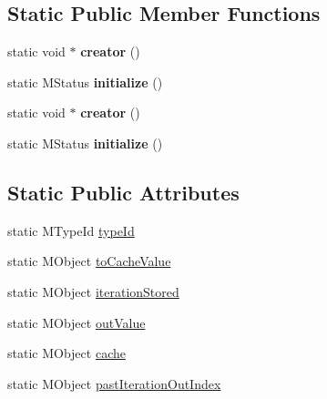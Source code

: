 \subsection*{Static Public Member Functions}
\begin{DoxyCompactItemize}
\item 
\hypertarget{class_m_g__cache_value_af783feaf5d718ffda4fa0008beb18f21}{static void $\ast$ {\bfseries creator} ()}\label{class_m_g__cache_value_af783feaf5d718ffda4fa0008beb18f21}

\item 
\hypertarget{class_m_g__cache_value_af6f22c4b64bdc0c12061b120fad9db90}{static M\-Status {\bfseries initialize} ()}\label{class_m_g__cache_value_af6f22c4b64bdc0c12061b120fad9db90}

\item 
\hypertarget{class_m_g__cache_value_af783feaf5d718ffda4fa0008beb18f21}{static void $\ast$ {\bfseries creator} ()}\label{class_m_g__cache_value_af783feaf5d718ffda4fa0008beb18f21}

\item 
\hypertarget{class_m_g__cache_value_af6f22c4b64bdc0c12061b120fad9db90}{static M\-Status {\bfseries initialize} ()}\label{class_m_g__cache_value_af6f22c4b64bdc0c12061b120fad9db90}

\end{DoxyCompactItemize}
\subsection*{Static Public Attributes}
\begin{DoxyCompactItemize}
\item 
static M\-Type\-Id \hyperlink{class_m_g__cache_value_a4ce6876428ec0f2695f7004b69347c97}{type\-Id}
\item 
static M\-Object \hyperlink{class_m_g__cache_value_af24eadb6c01a5b74fe866b9ca17f0b01}{to\-Cache\-Value}
\item 
static M\-Object \hyperlink{class_m_g__cache_value_a2c30422a3a121f421f0c5e7fcb409848}{iteration\-Stored}
\item 
static M\-Object \hyperlink{class_m_g__cache_value_ab5b43d3f3f79cc1dbf14d2351fda4ce6}{out\-Value}
\item 
static M\-Object \hyperlink{class_m_g__cache_value_af41d3e0480acf043362b219ccab05313}{cache}
\item 
static M\-Object \hyperlink{class_m_g__cache_value_a07da37e093b60361fec58f19b35082cf}{past\-Iteration\-Out\-Index}
\end{DoxyCompactItemize}


